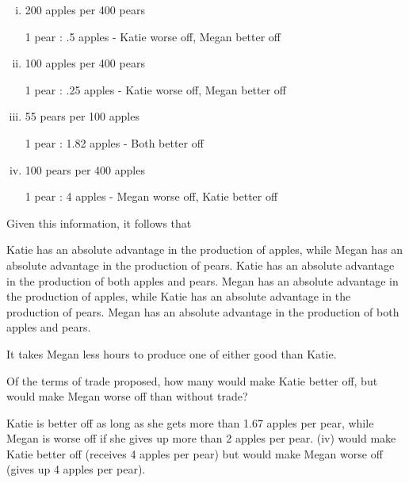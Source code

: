 \documentclass[addpoints,11pt]{exam}
\theoremstyle{definition}
\begin{document}
\begin{questions}
\begin{enumerate}[i.]
	\item 200 apples per 400 pears \begin{solution}1 pear : .5 apples - Katie worse off, Megan better off \end{solution}
	\item 100 apples per 400 pears \begin{solution}1 pear : .25 apples - Katie worse off, Megan better off \end{solution}
	\item 55 pears per 100 apples \begin{solution}1 pear : 1.82 apples - Both better off \end{solution}
	\item 100 pears per 400 apples \begin{solution}1 pear : 4 apples - Megan worse off, Katie better off \end{solution}
\end{enumerate}


\question \label{q12} Given this information, it follows that 

\begin{choices}
	\choice Katie has an absolute advantage in the production of apples, while Megan has an absolute advantage in the production of pears.
	\choice Katie has an absolute advantage in the production of both apples and pears.
	\choice Megan has an absolute advantage in the production of apples, while Katie has an absolute advantage in the production of pears.
	\CorrectChoice Megan has an absolute advantage in the production of both apples and pears.
\end{choices}

\begin{solution}
	It takes Megan less hours to produce one of either good than Katie.
\end{solution}

\newpage

\question \label{q13} Of the terms of trade proposed, how many would make Katie better off, but would make Megan worse off than without trade?

\begin{choices}
\end{choices}

\begin{solution}
	Katie is better off as long as she gets more than 1.67 apples per pear, while Megan is worse off if she gives up more than 2 apples per pear. (iv) would make Katie better off (receives 4 apples per pear) but would make Megan worse off (gives up 4 apples per pear).
\end{solution}


\end{questions}
\end{document}
